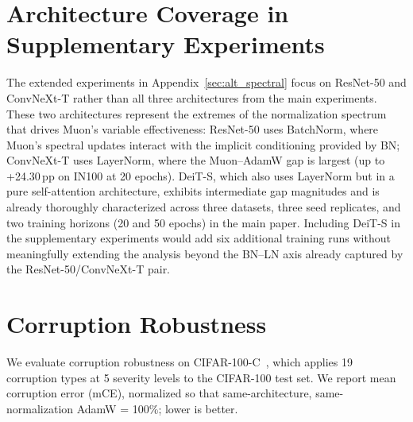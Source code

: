 \section{Architecture Coverage in Supplementary Experiments}\label{sec:arch_coverage}

The extended experiments in Appendix~\ref{sec:alt_spectral} focus on ResNet-50 and ConvNeXt-T rather than all three architectures from the main experiments. These two architectures represent the extremes of the normalization spectrum that drives Muon's variable effectiveness: ResNet-50 uses BatchNorm, where Muon's spectral updates interact with the implicit conditioning provided by BN; ConvNeXt-T uses LayerNorm, where the Muon--AdamW gap is largest (up to +24.30\,pp on IN100 at 20 epochs). DeiT-S, which also uses LayerNorm but in a pure self-attention architecture, exhibits intermediate gap magnitudes and is already thoroughly characterized across three datasets, three seed replicates, and two training horizons (20 and 50 epochs) in the main paper. Including DeiT-S in the supplementary experiments would add six additional training runs without meaningfully extending the analysis beyond the BN--LN axis already captured by the ResNet-50/ConvNeXt-T pair.

\section{Corruption Robustness}\label{sec:corruption_robustness}

We evaluate corruption robustness on CIFAR-100-C~\cite{hendrycks2019benchmarking}, which applies 19 corruption types at 5 severity levels to the CIFAR-100 test set. We report mean corruption error (mCE), normalized so that same-architecture, same-normalization AdamW = 100\%; lower is better.

